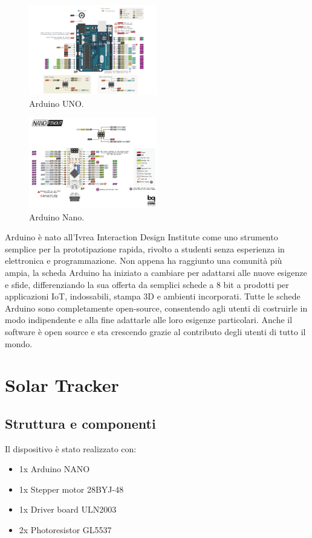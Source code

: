 \documentclass[12pt,oneside,a4paper]{article}
\begin{document}
\begin{figure}[ht!]
    \centering
    \includegraphics[width=0.5\textwidth]{figures/arduinoUNO.png}
    \caption{Arduino UNO.}
\end{figure}

\begin{figure}[ht!]
    \centering
    \includegraphics[width=0.5\textwidth]{figures/arduinoNANO.png}
    \caption{Arduino Nano.}
\end{figure}
Arduino è nato all'Ivrea Interaction Design Institute come uno strumento semplice per la prototipazione rapida, rivolto a studenti senza esperienza in elettronica e programmazione. Non appena ha raggiunto una comunità più ampia, la scheda Arduino ha iniziato a cambiare per adattarsi alle nuove esigenze e sfide, differenziando la sua offerta da semplici schede a 8 bit a prodotti per applicazioni IoT, indossabili, stampa 3D e ambienti incorporati. Tutte le schede Arduino sono completamente open-source, consentendo agli utenti di costruirle in modo indipendente e alla fine adattarle alle loro esigenze particolari. Anche il software è open source e sta crescendo grazie al contributo degli utenti di tutto il mondo.



\section{Solar Tracker}


\subsection{Struttura e componenti}
Il dispositivo è stato realizzato con:
\begin{itemize}
    \item 1x Arduino NANO
    \item 1x Stepper motor 28BYJ-48 \cite{MotorDatasheet}
    \item 1x Driver board ULN2003 \cite{DriverMotorDatasheet}
    \item 2x Photoresistor GL5537
\end{itemize}
\end{document}
